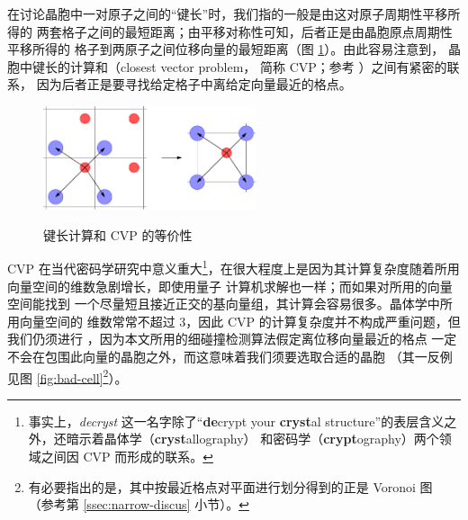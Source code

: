 在讨论晶胞中一对原子之间的“键长”时，我们指的一般是由这对原子周期性平移所得的
两套格子之间的最短距离；由平移对称性可知，后者正是由晶胞原点周期性平移所得的
格子到两原子之间位移向量的最短距离（图 \ref{fig:cryst-cvp}）。由此容易注意到，
晶胞中键长的计算和（closest vector problem，
简称 CVP；参考 \cite{micciancio2002}）之间有紧密的联系，
因为后者正是要寻找给定格子中离给定向量最近的格点。

\begin{figure}[htbp!]\bfcmd
\ffigbox%
	{\includegraphics[width = 0.56\textwidth]{img/cryst-cvp}}%
	{\caption{键长计算和 CVP 的等价性}\label{fig:cryst-cvp}}
\end{figure}

CVP 在当代密码学研究中意义重大\footnote{%
	事实上，\emph{decryst} 这一名字除了“\textbf{de}crypt your \textbf{cryst}al
	structure”的表层含义之外，还暗示着晶体学（\textbf{cryst}allography）
	和密码学（\textbf{crypt}ography）两个领域之间因 CVP 而形成的联系。%
}，在很大程度上是因为其计算复杂度随着所用向量空间的维数急剧增长，即使用量子
计算机求解也一样\parencite{micciancio2009}；而如果对所用的向量空间能找到
一个尽量短且接近正交的基向量组，其计算会容易很多。晶体学中所用向量空间的
维数常常不超过 3，因此 CVP 的计算复杂度并不构成严重问题，但我们仍须进行%
，因为本文所用的细碰撞检测算法假定离位移向量最近的格点
一定不会在包围此向量的晶胞之外，而这意味着我们须要选取合适的晶胞
（其一反例见图 \ref{fig:bad-cell}\footnote{%
	有必要指出的是，其中按最近格点对平面进行划分得到的正是 Voronoi 图
	（参考第 \ref{ssec:narrow-discus} 小节）。%
}）。

